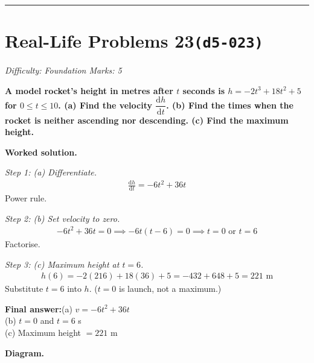 \documentclass[11pt]{article}
\newcommand{\question}[1]{\par\medskip\noindent\textbf{#1}\par}
\begin{document}
\medskip\hrule

\section*{Real-Life Problems 23\quad\small\texttt{(d5-023)}}
\textit{Difficulty: Foundation \quad\textbar\quad Marks: 5}

\question{A model rocket's height in metres after \( t \) seconds is \( h = -2t^3 + 18t^2 + 5 \) for \( 0 \leq t \leq 10 \). (a) Find the velocity \( \dfrac{\mathrm{d}h}{\mathrm{d}t} \). (b) Find the times when the rocket is neither ascending nor descending. (c) Find the maximum height.}

\textbf{Worked solution.}

\textit{Step 1: (a) Differentiate.}
\[\begin{gathered}
\frac{\mathrm{d}h}{\mathrm{d}t} = -6t^2 + 36t
\end{gathered}\]
Power rule.

\textit{Step 2: (b) Set velocity to zero.}
\[\begin{gathered}
-6t^2 + 36t = 0 \implies -6t(t - 6) = 0 \implies t = 0 \text{ or } t = 6
\end{gathered}\]
Factorise.

\textit{Step 3: (c) Maximum height at \( t = 6 \).}
\[\begin{gathered}
h(6) = -2(216) + 18(36) + 5 = -432 + 648 + 5 = 221 \text{ m}
\end{gathered}\]
Substitute \( t = 6 \) into \( h \). (\( t = 0 \) is launch, not a maximum.)

\begin{answerbox}
\textbf{Final answer:}\quad (a) \(\displaystyle  v = -6t^2 + 36t \) \\[3pt]  (b) \(\displaystyle  t = 0 \) and \(\displaystyle  t = 6 \) s \\[3pt]  (c) Maximum height \(\displaystyle  = 221 \) m
\end{answerbox}
\textbf{Diagram.}
\end{document}
